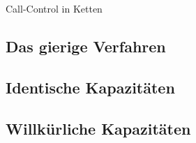 \begin{section}{Call-Control in Ketten}
\begin{frame}
	
\end{frame}

\subsection{Das gierige Verfahren}
\begin{frame}
	\begin{figure}[htbp]
		\centering
		\small
		\def\svgwidth{220bp}
		
		\label{fig:k-coloring}
	\end{figure}
	
	
\end{frame}
	
\subsection{Identische Kapazitäten}
\begin{frame}


\end{frame}


\subsection{Willkürliche Kapazitäten}
\begin{frame}
	
\end{frame}
\end{section}